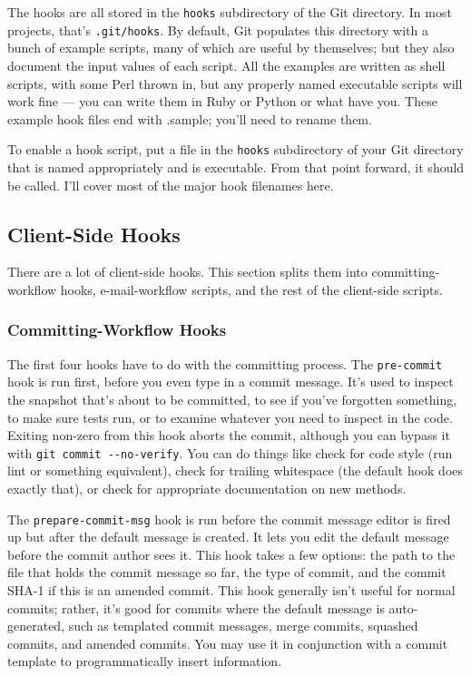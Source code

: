 \documentclass[a4paper]{book}
\newcounter{tab}[chapter]
\begin{document}
The hooks are all stored in the \texttt{hooks} subdirectory of the Git directory. In most projects, that's \texttt{.git/hooks}. By default, Git populates this directory with a bunch of example scripts, many of which are useful by themselves; but they also document the input values of each script. All the examples are written as shell scripts, with some Perl thrown in, but any properly named executable scripts will work fine --- you can write them in Ruby or Python or what have you. These example hook files end with .sample; you'll need to rename them.

To enable a hook script, put a file in the \texttt{hooks} subdirectory of your Git directory that is named appropriately and is executable. From that point forward, it should be called. I'll cover most of the major hook filenames here.

\subsection{Client-Side Hooks}\label{client-side-hooks}

There are a lot of client-side hooks. This section splits them into committing-workflow hooks, e-mail-workflow scripts, and the rest of the client-side scripts.

\subsubsection{Committing-Workflow Hooks}

The first four hooks have to do with the committing process. The \texttt{pre-commit} hook is run first, before you even type in a commit message. It's used to inspect the snapshot that's about to be committed, to see if you've forgotten something, to make sure tests run, or to examine whatever you need to inspect in the code. Exiting non-zero from this hook aborts the commit, although you can bypass it with \texttt{git commit -{}-no-verify}. You can do things like check for code style (run lint or something equivalent), check for trailing whitespace (the default hook does exactly that), or check for appropriate documentation on new methods.

The \texttt{prepare-commit-msg} hook is run before the commit message editor is fired up but after the default message is created. It lets you edit the default message before the commit author sees it. This hook takes a few options: the path to the file that holds the commit message so far, the type of commit, and the commit SHA-1 if this is an amended commit. This hook generally isn't useful for normal commits; rather, it's good for commits where the default message is auto-generated, such as templated commit messages, merge commits, squashed commits, and amended commits. You may use it in conjunction with a commit template to programmatically insert information.
\end{document}
